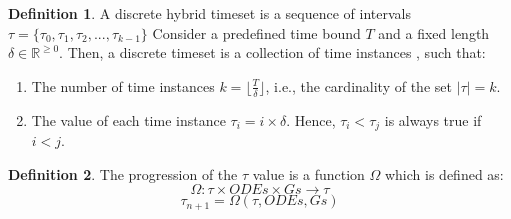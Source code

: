 \documentclass[twoside,a4paper,12pt]{article}
\theoremstyle{definition}
\newtheorem{definition}{Definition}
\begin{document}
\pagebreak


\begin{definition}
	A discrete hybrid timeset is a sequence of intervals $\tau = \{ \tau_0, \tau_1, \tau_2, ..., \tau_{k-1} \}$
	Consider a predefined time bound $T$ and a fixed length $\delta \in \mathbb{R}^{\geq0}$. Then, a discrete timeset is a collection of time instances , such that:
	\begin{enumerate}
		\item The number of time instances $k = \lfloor{\frac{T}{\delta}}\rfloor$, i.e., the cardinality of the set $| \tau | = k$.
		\item The value of each time instance $\tau_i = i \times \delta$. Hence, $\tau_i < \tau_j$ is always true if $i < j$.
	\end{enumerate}
	\label{ch1:def:timeset}
\end{definition}

\begin{definition}
	The progression of the $\tau$ value is a function $\Omega$ which is defined as:
	\begin{equation}
			\Omega : \tau \times ODEs \times Gs \rightarrow \tau
	\end{equation}
	$$ \tau_{n+1} = \Omega(\tau, ODEs, Gs) $$
\end{definition}
\end{document}
